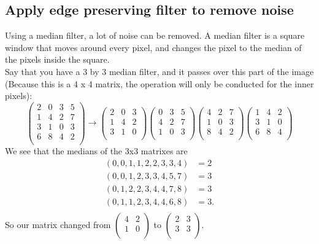 \documentclass[11pt,fleqn]{article}
\begin{document}
\subsection{Apply edge preserving filter to remove noise}
Using a median filter, a lot of noise can be removed. A median filter is a square window that moves around every pixel, and changes the pixel to the median of the pixels inside the square.\\
Say that you have a 3 by 3 median filter, and it passes over this part of the image (Because this is a 4 x 4 matrix, the operation will only be conducted for the inner pixels):
\[ \left( \begin{array}{cccc}
2 & 0 & 3 & 5 \\
1 & 4 & 2 & 7 \\
3 & 1 & 0 & 3 \\
6 & 8 & 4 & 2 \\ 
\end{array} \right)
\rightarrow
\left(\begin{array}{ccc}
2 & 0 & 3 \\
1 & 4 & 2 \\
3 & 1 & 0 \\
\end{array} \right)
\left(\begin{array}{ccc}
0 & 3 & 5 \\
4 & 2 & 7 \\
1 & 0 & 3 \\
\end{array} \right)
\left(\begin{array}{ccc}
4 & 2 & 7 \\
1 & 0 & 3 \\
8 & 4 & 2 \\
\end{array} \right)
\left(\begin{array}{ccc}
1 & 4 & 2 \\
3 & 1 & 0 \\
6 & 8 & 4 \\
\end{array} \right)\]
We see that the medians of the 3x3 matrixes are
\begin{equation} \label{eq1}
\begin{split}
(0,0,1,1,2,2,3,3,4) &=  2\\
(0,0,1,2,3,3,4,5,7) &=  3\\
(0,1,2,2,3,4,4,7,8) &=  3\\
(0,1,1,2,3,4,4,6,8) &=  3.\\
\end{split}
\end{equation}
So our matrix changed from $\left(\begin{array}{cc}
4 & 2 \\
1 & 0 \\
\end{array} \right)$ to $\left(\begin{array}{cc}
2 & 3 \\
3 & 3 \\
\end{array} \right)$.
\end{document}
